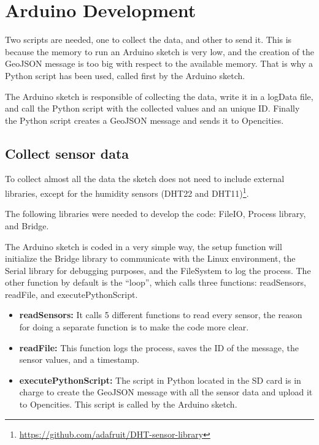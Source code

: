 \documentclass[12pt, a4paper,twoside]{tesi_upf}
\begin{document}
  \section{Arduino Development}
    
    Two scripts are needed, one to collect the data, and other to send it. This is because the memory to run an Arduino sketch is very low, and the creation of the GeoJSON message is too big with respect to the available memory. That is why a Python script has been used, called first by the Arduino sketch.
    
    The Arduino sketch is responsible of collecting the data, write it in a logData file, and call the Python script with the collected values and an unique ID. Finally the Python script creates a GeoJSON message and sends it to Opencities.
    
    \subsection{Collect sensor data}
    
      To collect almost all the data the sketch does not need to include external libraries, except for the humidity sensors (DHT22 and DHT11)\footnote{\url{https://github.com/adafruit/DHT-sensor-library}}.
      
      The following libraries were needed to develop the code: FileIO, Process library, and Bridge.
      
      The Arduino sketch is coded in a very simple way, the setup function will initialize the Bridge library to communicate with the Linux environment, the Serial library for debugging purposes, and the FileSystem to log the process.
      The other function by default is the ``loop'', which calls three functions: readSensors, readFile, and executePythonScript.
      
      \begin{itemize}
        \item {\bf readSensors:} It calls 5 different functions to read every sensor, the reason for doing a separate function is to make the code more clear.
        \item {\bf readFile:} This function logs the process, saves the ID of the message, the sensor values, and a timestamp.
        \item {\bf executePythonScript:} The script in Python located in the SD card is in charge to create the GeoJSON message with all the sensor data and upload it to Opencities. This script is called by the Arduino sketch.
      \end{itemize}
      
\end{document}

